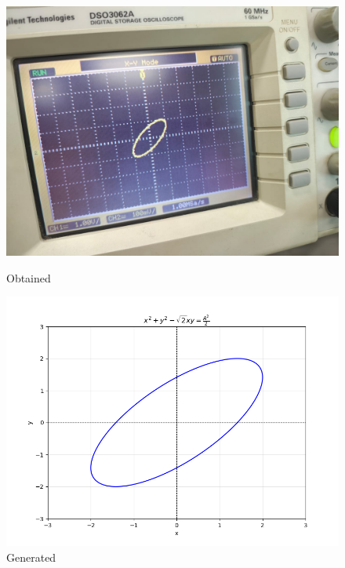 \documentclass[a4paper,12pt]{article}
\numberwithin{equation}{section} %
\begin{document}
\begin{figure}[htbp]
    \centering
    \begin{minipage}{0.45\textwidth}
        \centering
        \includegraphics[width=\linewidth]{Graphs/Graph7.jpeg}
        \caption{Obtained}
    \end{minipage}
    \hfill
    \begin{minipage}{0.45\textwidth}
        \centering
        \includegraphics[width=\linewidth]{Python plots/lab2.png} 
        \caption{Generated}
    \end{minipage}
\end{figure}
\newpage
\end{document}
